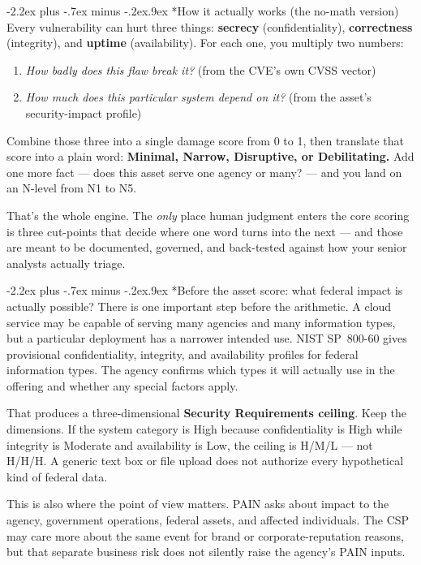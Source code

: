 \documentclass[11pt]{article}
\makeatletter
\renewcommand\section{\@startsection{section}{1}{\z@}%
  {-2.2ex plus -.7ex minus -.2ex}{.9ex}%
  {\normalfont\Large\bfseries}}
\makeatother
\begin{document}
\section*{How it actually works (the no-math version)}
Every vulnerability can hurt three things: \textbf{secrecy} (confidentiality),
\textbf{correctness} (integrity), and \textbf{uptime} (availability). For each one,
you multiply two numbers:
\begin{enumerate}[leftmargin=1.8em]
\item \emph{How badly does this flaw break it?} (from the CVE's own CVSS vector)
\item \emph{How much does this particular system depend on it?} (from the asset's
  security-impact profile)
\end{enumerate}

Combine those three into a single damage score from 0 to 1, then translate that
score into a plain word: \textbf{Minimal, Narrow, Disruptive, or Debilitating.} Add
one more fact --- does this asset serve one agency or many? --- and you land on an
N-level from N1 to N5.

That's the whole engine. The \emph{only} place human judgment enters the core
scoring is three cut-points that decide where one word turns into the next --- and
those are meant to be documented, governed, and back-tested against how your senior
analysts actually triage.

\section*{Before the asset score: what federal impact is actually possible?}
There is one important step before the arithmetic. A cloud service may be capable
of serving many agencies and many information types, but a particular deployment
has a narrower intended use. NIST SP~800-60 gives provisional confidentiality,
integrity, and availability profiles for federal information types. The agency
confirms which types it will actually use in the offering and whether any special
factors apply.

That produces a three-dimensional \textbf{Security Requirements ceiling}. Keep the
dimensions. If the system category is High because confidentiality is High while
integrity is Moderate and availability is Low, the ceiling is H/M/L --- not H/H/H.
A generic text box or file upload does not authorize every hypothetical kind of
federal data.

This is also where the point of view matters. PAIN asks about impact to the agency,
government operations, federal assets, and affected individuals. The CSP may care
more about the same event for brand or corporate-reputation reasons, but that
separate business risk does not silently raise the agency's PAIN inputs.
\end{document}
